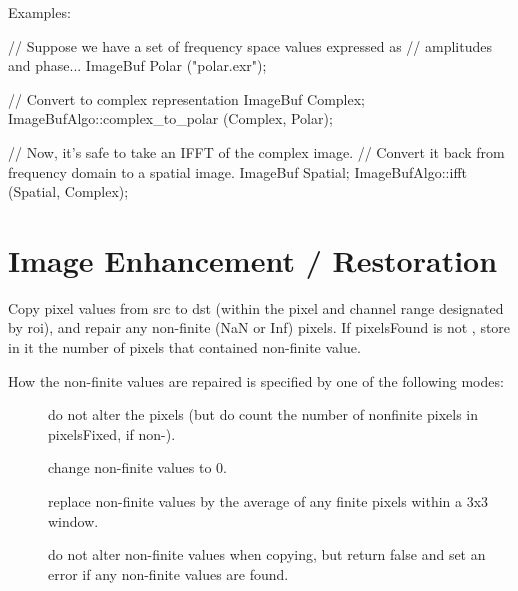 \smallskip
\noindent Examples:
\begin{code}
    // Suppose we have a set of frequency space values expressed as
    // amplitudes and phase...
    ImageBuf Polar ("polar.exr");

    // Convert to complex representation
    ImageBuf Complex;
    ImageBufAlgo::complex_to_polar (Complex, Polar);

    // Now, it's safe to take an IFFT of the complex image.
    // Convert it back from frequency domain to a spatial image.
    ImageBuf Spatial;
    ImageBufAlgo::ifft (Spatial, Complex);
\end{code}
\apiend



\section{Image Enhancement / Restoration}
\label{sec:iba:enhance}

 

Copy pixel values from {\cf src} to {\cf dst} (within the pixel and channel
range designated by {\cf roi}), and repair any non-finite ({\cf NaN} or {\cf
Inf}) pixels.  If {\cf pixelsFound} is not \NULL, store in it the number of
pixels that contained non-finite value.

How the non-finite values are repaired is specified by one of the
following modes:

\begin{description} 
\item[\spc] \spc
\item[\rm {}]   do not alter the pixels (but do count the number
                       of nonfinite pixels in {\cf *pixelsFixed}, if non-\NULL).
\item[\rm {}]  change non-finite values to 0.
\item[\rm {}]   replace non-finite values by the average of any
                     finite pixels within a 3x3 window.
\item[\rm {}]  do not alter non-finite values when copying,
                     but return {\cf false} and set an error if any non-finite
                     values are found.
\end{description}

